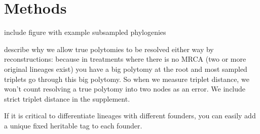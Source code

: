 \section{Methods} \label{sec:methods}

include figure with example subsampled phylogenies

describe why we allow true polytomies to be resolved either way by reconstructions: because in treatments where there is no MRCA (two or more original lineages exist) you have a big polytomy at the root and most sampled triplets go through this big polytomy.
So when we measure triplet distance, we won't count resolving a true polytomy into two nodes as an error.
We include strict triplet distance in the supplement.

If it is critical to differentiate lineages with different founders, you can easily add a unique fixed heritable tag to each founder.


